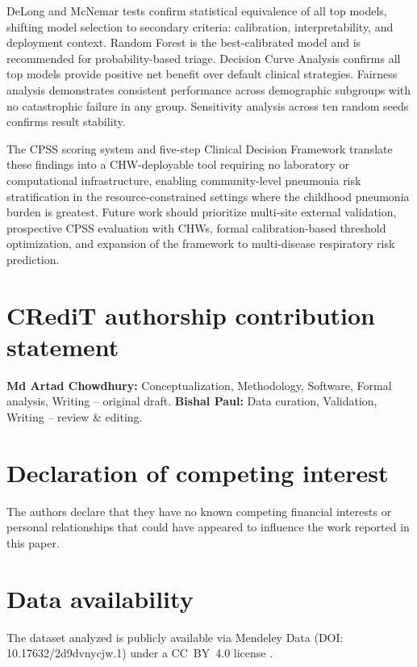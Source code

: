 \documentclass[3p,times,twocolumn]{elsarticle}
\begin{document}
DeLong and McNemar tests confirm statistical equivalence of all top models, shifting model selection to secondary criteria: calibration, interpretability, and deployment context. Random Forest is the best-calibrated model and is recommended for probability-based triage. Decision Curve Analysis confirms all top models provide positive net benefit over default clinical strategies. Fairness analysis demonstrates consistent performance across demographic subgroups with no catastrophic failure in any group. Sensitivity analysis across ten random seeds confirms result stability.

The CPSS scoring system and five-step Clinical Decision Framework translate these findings into a CHW-deployable tool requiring no laboratory or computational infrastructure, enabling community-level pneumonia risk stratification in the resource-constrained settings where the childhood pneumonia burden is greatest. Future work should prioritize multi-site external validation, prospective CPSS evaluation with CHWs, formal calibration-based threshold optimization, and expansion of the framework to multi-disease respiratory risk prediction.

\section*{CRediT authorship contribution statement}
\textbf{Md Artad Chowdhury:} Conceptualization, Methodology, Software, Formal analysis, Writing -- original draft. \textbf{Bishal Paul:} Data curation, Validation, Writing -- review \& editing.

\section*{Declaration of competing interest}
The authors declare that they have no known competing financial interests or personal relationships that could have appeared to influence the work reported in this paper.

\section*{Data availability}
The dataset analyzed is publicly available via Mendeley Data (DOI: 10.17632/2d9dvnycjw.1) under a CC~BY~4.0 license \cite{ref15}.



\end{document}
